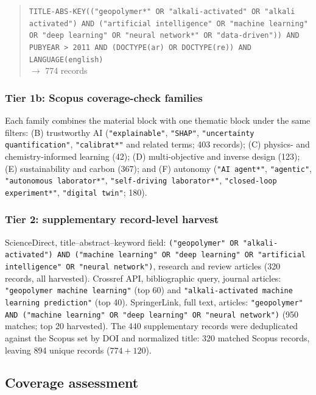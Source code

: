 \documentclass[pdflatex,sn-basic]{sn-jnl}
\begin{document}
\begin{quote}\small
\texttt{TITLE-ABS-KEY(("geopolymer*" OR "alkali-activated" OR "alkali activated") AND ("artificial intelligence" OR "machine learning" OR "deep learning" OR "neural network*" OR "data-driven")) AND PUBYEAR > 2011 AND (DOCTYPE(ar) OR DOCTYPE(re)) AND LANGUAGE(english)}\\
$\rightarrow$ 774 records
\end{quote}

\subsubsection{Tier 1b: Scopus coverage-check families}

Each family combines the material block with one thematic block under the same filters: (B) trustworthy AI (\texttt{"explainable"}, \texttt{"SHAP"}, \texttt{"uncertainty quantification"}, \texttt{"calibrat*"} and related terms; 403 records); (C) physics- and chemistry-informed learning (42); (D) multi-objective and inverse design (123); (E) sustainability and carbon (367); and (F) autonomy (\texttt{"AI agent*"}, \texttt{"agentic"}, \texttt{"autonomous laborator*"}, \texttt{"self-driving laborator*"}, \texttt{"closed-loop experiment*"}, \texttt{"digital twin"}; 180).

\subsubsection{Tier 2: supplementary record-level harvest}

ScienceDirect, title--abstract--keyword field: \texttt{("geopolymer" OR "alkali-activated") AND ("machine learning" OR "deep learning" OR "artificial intelligence" OR "neural network")}, research and review articles (320 records, all harvested). Crossref API, bibliographic query, journal articles: \texttt{"geopolymer machine learning"} (top 60) and \texttt{"alkali-activated machine learning prediction"} (top 40). SpringerLink, full text, articles: \texttt{"geopolymer" AND ("machine learning" OR "deep learning" OR "neural network")} (950 matches; top 20 harvested). The 440 supplementary records were deduplicated against the Scopus set by DOI and normalized title: 320 matched Scopus records, leaving 894 unique records ($774 + 120$).

\subsection{Coverage assessment}\label{sec:coverage}
\end{document}
